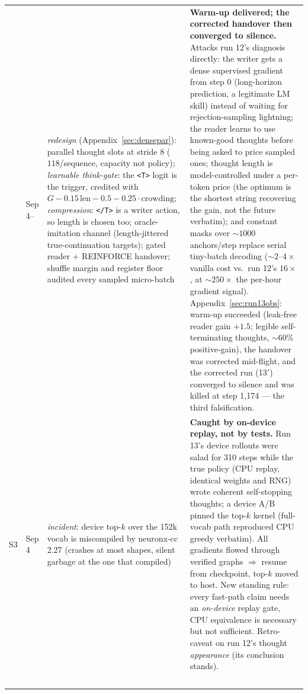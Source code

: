 \documentclass{article} %
\newcommand{\gain}{G}
\newcommand{\tstart}{\texttt{<T>}}
\newcommand{\tend}{\texttt{</T>}}
\begin{document}
{\begin{longtable}{@{}llp{3.6cm}p{5.6cm}@{}}
\addlinespace
13 & Sep 4-- & \emph{redesign} (Appendix~\ref{sec:densepar}): parallel thought slots at stride 8 ($118$/sequence, capacity not policy); \emph{learnable think-gate}: the \tstart{} logit is the trigger, credited with $\gain - 0.15\,\mathrm{len} - 0.5 - 0.25\cdot\mathrm{crowding}$; \emph{compression}: \tend{} is a writer action, so length is chosen too; oracle-imitation channel (length-jittered true-continuation targets); gated reader + REINFORCE handover; shuffle margin and register floor audited every sampled micro-batch & \textbf{Warm-up delivered; the corrected handover then converged to silence.} Attacks run 12's diagnosis directly: the writer gets a dense supervised gradient from step 0 (long-horizon prediction, a legitimate LM skill) instead of waiting for rejection-sampling lightning; the reader learns to use known-good thoughts before being asked to price sampled ones; thought length is model-controlled under a per-token price (the optimum is the shortest string recovering the gain, not the future verbatim); and constant masks over ${\sim}1000$ anchors/step replace serial tiny-batch decoding ($\sim$$2$--$4\times$ vanilla cost vs.\ run 12's $16\times$, at ${\sim}250\times$ the per-hour gradient signal). Appendix~\ref{sec:run13obs}: warm-up succeeded (leak-free reader gain $+1.5$; legible self-terminating thoughts, ${\sim}60\%$ positive-gain), the handover was corrected mid-flight, and the corrected run (13$'$) converged to silence and was killed at step 1{,}174 --- the third falsification. \\
\addlinespace
S3 & Sep 4 & \emph{incident}: device top-$k$ over the 152k vocab is miscompiled by neuronx-cc 2.27 (crashes at most shapes, silent garbage at the one that compiled) & \textbf{Caught by on-device replay, not by tests.} Run 13's device rollouts were salad for 310 steps while the true policy (CPU replay, identical weights and RNG) wrote coherent self-stopping thoughts; a device A/B pinned the top-$k$ kernel (full-vocab path reproduced CPU greedy verbatim). All gradients flowed through verified graphs $\Rightarrow$ resume from checkpoint, top-$k$ moved to host. New standing rule: every fast-path claim needs an \emph{on-device} replay gate, CPU equivalence is necessary but not sufficient. Retro-caveat on run 12's thought \emph{appearance} (its conclusion stands). \\
\addlinespace
$$
\end{longtable}}
\end{document}
